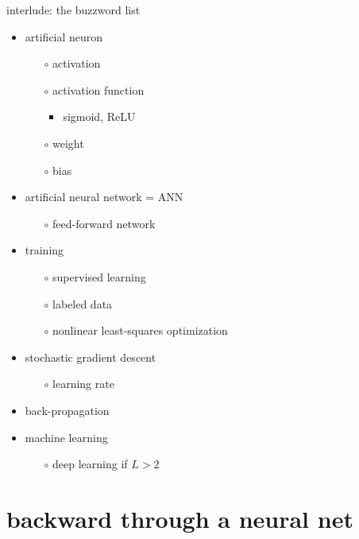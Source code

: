 \documentclass[xcolor={svgnames},
               hyperref={colorlinks,citecolor=DeepPink4,linkcolor=FireBrick,urlcolor=Maroon}]
               {beamer}
\begin{document}
\begin{frame}{interlude: the buzzword list}

\begin{itemize}
\item \alert{artificial neuron}
    \begin{itemize}
    \item[$\circ$] \alert{activation}
    \item[$\circ$] \alert{activation function}
        \begin{itemize}
        \item sigmoid, ReLU
        \end{itemize}
    \item[$\circ$] \alert{weight}
    \item[$\circ$] \alert{bias}
    \end{itemize}
\item \alert{artificial neural network} = ANN
    \begin{itemize}
    \item[$\circ$] feed-forward network
    \end{itemize}
\item \alert{training}
    \begin{itemize}
    \item[$\circ$] \alert{supervised learning}
    \item[$\circ$] labeled data
    \item[$\circ$] nonlinear least-squares optimization
    \end{itemize}
\item \alert{stochastic gradient descent}
    \begin{itemize}
    \item[$\circ$] learning rate
    \end{itemize}
\item \alert{back-propagation}

\hspace{-7mm} \hrulefill
\item \alert{machine learning}
    \begin{itemize}
    \item[$\circ$] \alert{deep learning} if $L>2$
    \end{itemize}
\end{itemize}
\end{frame}


\section{backward through a neural net}
\end{document}
